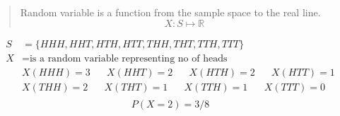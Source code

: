 \begin{slide}
	\begin{shaded}
  \begin{quote}
  Random variable is a function from the sample space to the real line.
	 $$X:S\mapsto \mathbb{R}$$
  \end{quote}
  \end{shaded}
  \begin{align*}
    S &= \{HHH, HHT, HTH , HTT, THH, THT, TTH,  TTT\}\\
    X &= \text{is a random variable representing no of heads}\\
    &X(HHH) = 3\hspace{20pt} 
    X(HHT) = 2 \hspace{20pt}
    X(HTH) = 2\hspace{20pt}
    X(HTT) = 1\\
    &X(THH) = 2\hspace{20pt}
    X(THT) = 1\hspace{20pt}
    X(TTH) = 1\hspace{20pt}
    X(TTT) = 0\\
   \end{align*}
     $$P(X=2) = 3/8$$
\end{slide}


